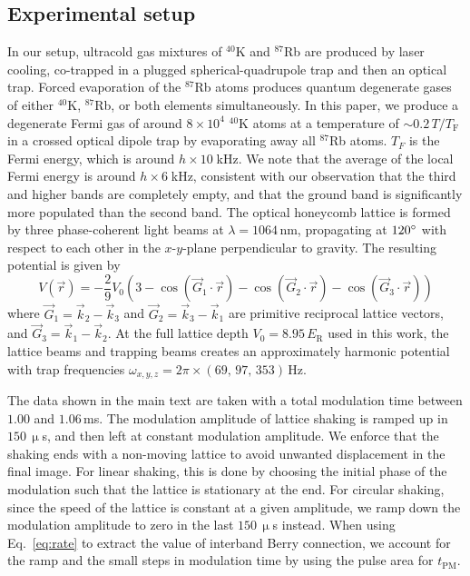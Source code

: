 \documentclass[superscriptaddress, reprint, amsmath, amssymb, aps, prl]{revtex4-2}
\begin{document}
\subsection{Experimental setup}
In our setup, ultracold gas mixtures of $^{40}$K and $^{87}$Rb are produced by laser cooling, co-trapped in a plugged spherical-quadrupole trap and then an optical trap.   Forced evaporation of the $^{87}$Rb atoms produces quantum degenerate gases of either $^{40}$K, $^{87}$Rb, or both elements simultaneously.  In this paper, we produce a degenerate Fermi gas of around $8 \times 10^4$ $^{40}\mathrm{K}$ atoms at a temperature of $\sim0.2 \, T / T_\mathrm{F}$ in a crossed optical dipole trap by evaporating away all $^{87}$Rb atoms.
$T_F$ is the Fermi energy, which is around $h \times 10\;$kHz. We note that the average of the local Fermi energy is around $h \times 6\;$kHz, consistent with our observation that the third and higher bands are completely empty, and that the ground band is significantly more populated than the second band. The optical honeycomb lattice is formed by three phase-coherent light beams at $\lambda = 1064\,$nm, propagating at $120 \degree$ with respect to each other in the $x$-$y$-plane perpendicular to gravity. The resulting potential is given by
\begin{equation*}
    V(\vec{r}) = -\frac{2}{9} V_0 \left(3
- \cos(\vec{G}_1 \cdot \vec{r}) 
- \cos(\vec{G}_2 \cdot \vec{r})
- \cos(\vec{G}_3 \cdot \vec{r}) \right)
\end{equation*}
where $\vec{G}_1 = \vec{k}_2 - \vec{k}_3$ and $\vec{G}_2 = \vec{k}_3 - \vec{k}_1$ are primitive reciprocal lattice vectors, and $\vec{G}_3 = \vec{k}_1 - \vec{k}_2$. At the full lattice depth $V_0 = 8.95 \, E_\mathrm{R}$ used in this work, the lattice beams and trapping beams creates an approximately harmonic potential with trap frequencies $\omega_{x, y, z} = 2\pi \times (69,\,97,\,353)\,$Hz.

The data shown in the main text are taken with a total modulation time between $1.00$ and $1.06\,$ms. The modulation amplitude of lattice shaking is ramped up in $150\,\upmu$s, and then left at constant modulation amplitude. We enforce that the shaking ends with a non-moving lattice to avoid unwanted displacement in the final image. For linear shaking, this is done by choosing the initial phase of the modulation such that the lattice is stationary at the end. For circular shaking, since the speed of the lattice is constant at a given amplitude, we ramp down the modulation amplitude to zero in the last $150\,\upmu$s instead. When using Eq.~\eqref{eq:rate} to extract the value of interband Berry connection, we account for the ramp and the small steps in modulation time by using the pulse area for $t_{\mathrm{PM}}$.
\end{document}

